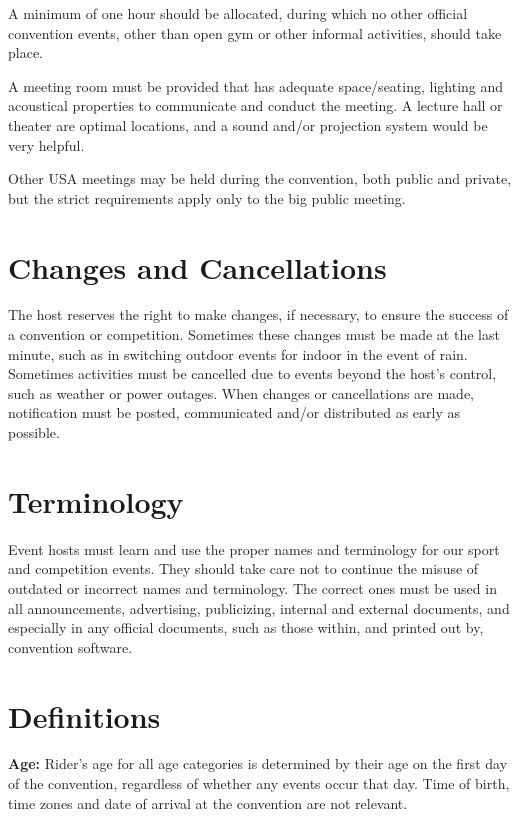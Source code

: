 A minimum of one hour should be allocated, during which no other official convention events, other than open gym or other informal activities, should take place.

A meeting room must be provided that has adequate space/seating, lighting and acoustical properties to communicate and conduct the meeting.
A lecture hall or theater are optimal locations, and a sound and/or projection system would be very helpful.

Other USA meetings may be held during the convention, both public and private, but the strict requirements apply only to the big public meeting.

\section{Changes and Cancellations}

The host reserves the right to make changes, if necessary, to ensure the success of a convention or competition.
Sometimes these changes must be made at the last minute, such as in switching outdoor events for indoor in the event of rain.
Sometimes activities must be cancelled due to events beyond the host's control, such as weather or power outages.
When changes or cancellations are made, notification must be posted, communicated and/or distributed as early as possible.

\section{Terminology}
Event hosts must learn and use the proper names and terminology for our sport and competition events.
They should take care not to continue the misuse of outdated or incorrect names and terminology.
The correct ones must be used in all announcements, advertising, publicizing, internal and external documents, and especially in any official documents, such as those within, and printed out by, convention software.

\section{Definitions \label{chap:general_definitions}}

\textbf{Age:} Rider's age for all age categories is determined by their age on the first day of the convention, regardless of whether any events occur that day.
Time of birth, time zones and date of arrival at the convention are not relevant.


